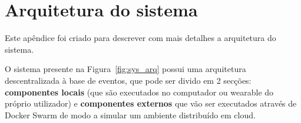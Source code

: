 \chapter{Arquitetura do sistema}
\label{chap:appendix-architecture}

\begin{introduction}
Este apêndice foi criado para descrever com mais detalhes a arquitetura do sistema.
\end{introduction}

O sistema presente na Figura~\ref{fig:sys_arq} possui uma arquitetura descentralizada à base de eventos, que pode ser divido em 2 secções: \textbf{componentes locais} (que são executados no computador ou wearable do próprio utilizador) e \textbf{componentes externos} que vão ser executados através de Docker Swarm de modo a simular um ambiente distribuído em cloud.


